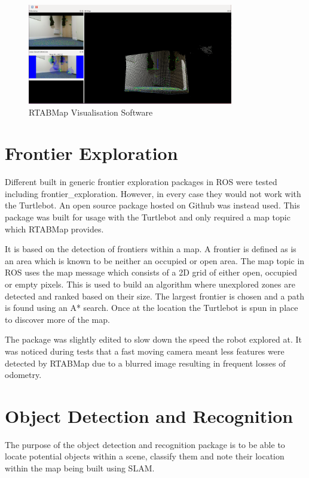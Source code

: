 \documentclass{mproj}
\begin{document}
\begin{figure}
   \caption{RTABMap Visualisation Software}
   \centering
   \includegraphics[width=0.8\textwidth]{images/rtab.png}
\end{figure} 

\section{Frontier Exploration}

Different built in generic frontier exploration packages in ROS were tested including frontier\_exploration. However, in every case they would not work with the Turtlebot. An open source package hosted on Github was instead used. \cite{explore} This package was built for usage with the Turtlebot and only required a map topic which RTABMap provides.

It is based on the detection of frontiers within a map. A frontier is defined as is an area which is known to be neither an occupied or open area. The map topic in ROS uses the map message which consists of a 2D grid of either open, occupied or empty pixels. This is used to build an algorithm where unexplored zones are detected and ranked based on their size. The largest frontier is chosen and a path is found using an A* search. Once at the location the Turtlebot is spun in place to discover more of the map.

The package was slightly edited to slow down the speed the robot explored at. It was noticed during tests that a fast moving camera meant less features were detected by RTABMap due to a blurred image resulting in frequent losses of odometry.

\section{Object Detection and Recognition}
The purpose of the object detection and recognition package is to be able to locate potential objects within a scene, classify them and note their location within the map being built using SLAM.
\end{document}

